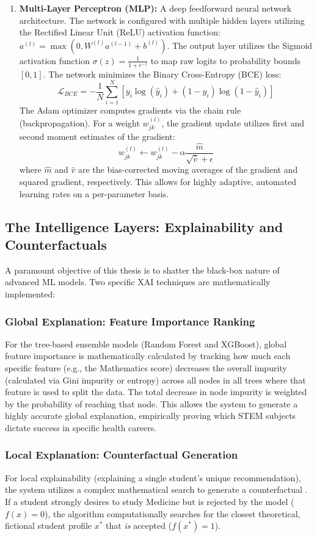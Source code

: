 \begin{enumerate}
    \item \textbf{Multi-Layer Perceptron (MLP):} A deep feedforward neural network architecture. The network is configured with multiple hidden layers utilizing the Rectified Linear Unit (ReLU) activation function: $a^{(l)} = \max(0, W^{(l)}a^{(l-1)} + b^{(l)})$. The output layer utilizes the Sigmoid activation function $\sigma(z) = \frac{1}{1 + e^{-z}}$ to map raw logits to probability bounds $[0, 1]$. The network minimizes the Binary Cross-Entropy (BCE) loss:
    \[
    \mathcal{L}_{BCE} = -\frac{1}{N} \sum_{i=1}^{N} \left[ y_i \log(\hat{y}_i) + (1 - y_i) \log(1 - \hat{y}_i) \right]
    \]
    The Adam optimizer computes gradients via the chain rule (backpropagation). For a weight $w_{jk}^{(l)}$, the gradient update utilizes first and second moment estimates of the gradient:
    \[
    w_{jk}^{(l)} \leftarrow w_{jk}^{(l)} - \alpha \frac{\hat{m}}{\sqrt{\hat{v}} + \epsilon}
    \]
    where $\hat{m}$ and $\hat{v}$ are the bias-corrected moving averages of the gradient and squared gradient, respectively. This allows for highly adaptive, automated learning rates on a per-parameter basis.
\end{enumerate}

\subsection{The Intelligence Layers: Explainability and Counterfactuals}

A paramount objective of this thesis is to shatter the black-box nature of advanced ML models. Two specific XAI techniques are mathematically implemented:

\subsubsection{Global Explanation: Feature Importance Ranking}
For the tree-based ensemble models (Random Forest and XGBoost), global feature importance is mathematically calculated by tracking how much each specific feature (e.g., the Mathematics score) decreases the overall impurity (calculated via Gini impurity or entropy) across all nodes in all trees where that feature is used to split the data. The total decrease in node impurity is weighted by the probability of reaching that node. This allows the system to generate a highly accurate global explanation, empirically proving which STEM subjects dictate success in specific health careers.

\subsubsection{Local Explanation: Counterfactual \parencite{wachter2017counterfactual} Generation}
For local explainability (explaining a single student's unique recommendation), the system utilizes a complex mathematical search to generate a counterfactual \parencite{wachter2017counterfactual}. If a student strongly desires to study Medicine but is rejected by the model ($f(x) = 0$), the algorithm computationally searches for the closest theoretical, fictional student profile $x^*$ that \textit{is} accepted ($f(x^*) = 1$). 

